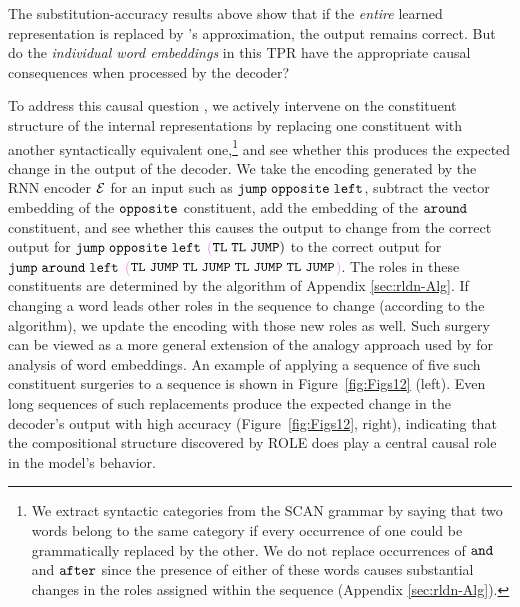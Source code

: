 The substitution-accuracy results above show that if the \textit{entire} learned representation is replaced by \RLN's approximation, the output remains correct. But do the \textit{individual word embeddings} in this TPR have the appropriate causal consequences when processed by the decoder?%

To address this causal question \citep{pearl2000causality}, we actively intervene on the constituent structure of the internal representations by replacing one constituent with another syntactically equivalent
one,\footnote{We extract syntactic categories from the SCAN grammar \citep[Supplementary Fig. 6]{lake2018generalization} by saying that two words belong to the same category if every occurrence of one could be grammatically replaced by the other. We do not replace occurrences of \textcolor{violet}{${\mathtt{and}}$} and \textcolor{violet}{${\mathtt{after}}$} since the presence of either of these words causes substantial changes in the roles assigned within the sequence (Appendix \ref{sec:rldn-Alg}).} and see whether this produces the expected change in the output of the decoder.
We take the encoding generated by the RNN encoder ${\mathcal{E}}$ for an input such as \textcolor{violet}{${\mathtt{jump \hspace{1mm} opposite \hspace{1mm} left}}$}, subtract the vector embedding of the \textcolor{violet}{${\mathtt{opposite}}$} constituent, add the embedding of the \textcolor{violet}{${\mathtt{around}}$} constituent, and see whether this causes the output to change from the correct output for \textcolor{violet}{${\mathtt{jump \hspace{1mm} opposite \hspace{1mm} left}}$ (${\mathtt{TL \hspace{1mm} TL \hspace{1mm} JUMP)}}$} to the correct output for \textcolor{violet}{${\mathtt{jump \hspace{1mm} around \hspace{1mm} left}}$ (${\mathtt{TL \hspace{1mm} JUMP \hspace{1mm} TL \hspace{1mm} JUMP \hspace{1mm} TL \hspace{1mm} JUMP \hspace{1mm} TL \hspace{1mm} JUMP}}$)}. The roles in these constituents are determined by the algorithm of Appendix \ref{sec:rldn-Alg}. If changing a word leads other roles in the sequence to change (according to the algorithm), we update the encoding with those new roles as well. Such surgery can be viewed as a more general extension of the analogy approach used by \citet{mikolov2013linguistic} for analysis of word embeddings.
An example of applying a sequence of five such constituent surgeries to a sequence is shown in Figure~\ref{fig:Figs12} (left). Even long sequences of such replacements produce the expected change in the decoder's output with high accuracy (Figure~\ref{fig:Figs12}, right), indicating that the compositional structure discovered by ROLE does play a central causal role in the model's behavior.

